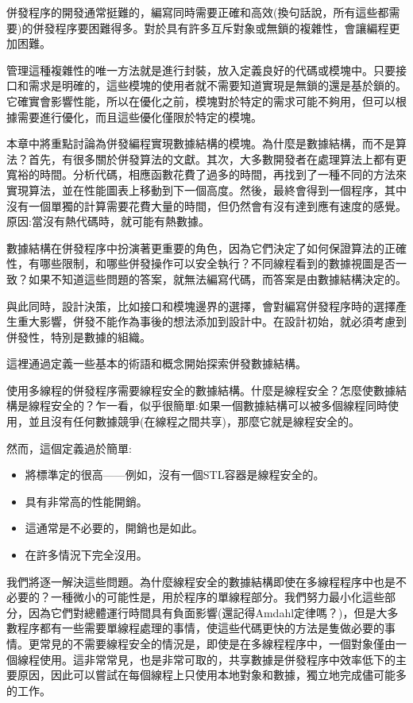 
併發程序的開發通常挺難的，編寫同時需要正確和高效(換句話說，所有這些都需要)的併發程序要困難得多。對於具有許多互斥對象或無鎖的複雜性，會讓編程更加困難。

管理這種複雜性的唯一方法就是進行封裝，放入定義良好的代碼或模塊中。只要接口和需求是明確的，這些模塊的使用者就不需要知道實現是無鎖的還是基於鎖的。它確實會影響性能，所以在優化之前，模塊對於特定的需求可能不夠用，但可以根據需要進行優化，而且這些優化僅限於特定的模塊。

本章中將重點討論為併發編程實現數據結構的模塊。為什麼是數據結構，而不是算法？首先，有很多關於併發算法的文獻。其次，大多數開發者在處理算法上都有更寬裕的時間。分析代碼，相應函數花費了過多的時間，再找到了一種不同的方法來實現算法，並在性能圖表上移動到下一個高度。然後，最終會得到一個程序，其中沒有一個單獨的計算需要花費大量的時間，但仍然會有沒有達到應有速度的感覺。原因:當沒有熱代碼時，就可能有熱數據。

數據結構在併發程序中扮演著更重要的角色，因為它們決定了如何保證算法的正確性，有哪些限制，和哪些併發操作可以安全執行？不同線程看到的數據視圖是否一致？如果不知道這些問題的答案，就無法編寫代碼，而答案是由數據結構決定的。

與此同時，設計決策，比如接口和模塊邊界的選擇，會對編寫併發程序時的選擇產生重大影響，併發不能作為事後的想法添加到設計中。在設計初始，就必須考慮到併發性，特別是數據的組織。

這裡通過定義一些基本的術語和概念開始探索併發數據結構。


使用多線程的併發程序需要線程安全的數據結構。什麼是線程安全？怎麼使數據結構是線程安全的？乍一看，似乎很簡單:如果一個數據結構可以被多個線程同時使用，並且沒有任何數據競爭(在線程之間共享)，那麼它就是線程安全的。

然而，這個定義過於簡單:

\begin{itemize}
\item 將標準定的很高——例如，沒有一個STL容器是線程安全的。
\item 具有非常高的性能開銷。
\item 這通常是不必要的，開銷也是如此。
\item 在許多情況下完全沒用。
\end{itemize}

我們將逐一解決這些問題。為什麼線程安全的數據結構即使在多線程程序中也是不必要的？一種微小的可能性是，用於程序的單線程部分。我們努力最小化這些部分，因為它們對總體運行時間具有負面影響(還記得Amdahl定律嗎？)，但是大多數程序都有一些需要單線程處理的事情，使這些代碼更快的方法是隻做必要的事情。更常見的不需要線程安全的情況是，即使是在多線程程序中，一個對象僅由一個線程使用。這非常常見，也是非常可取的，共享數據是併發程序中效率低下的主要原因，因此可以嘗試在每個線程上只使用本地對象和數據，獨立地完成儘可能多的工作。

